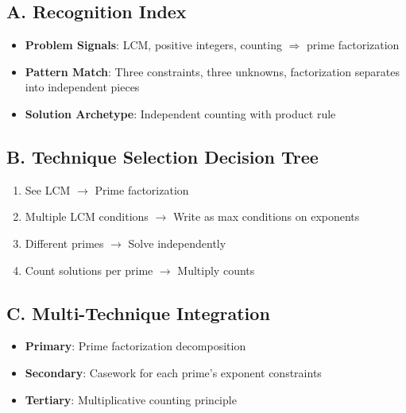 \documentclass[12pt]{article}
\begin{document}
\begin{conversionbox}
\subsection*{A. Recognition Index}
\begin{itemize}[leftmargin=*]
    \item \textbf{Problem Signals}: LCM, positive integers, counting $\Rightarrow$ prime factorization
    \item \textbf{Pattern Match}: Three constraints, three unknowns, factorization separates into independent pieces
    \item \textbf{Solution Archetype}: Independent counting with product rule
\end{itemize}

\subsection*{B. Technique Selection Decision Tree}
\begin{enumerate}
    \item See LCM $\rightarrow$ Prime factorization
    \item Multiple LCM conditions $\rightarrow$ Write as max conditions on exponents  
    \item Different primes $\rightarrow$ Solve independently
    \item Count solutions per prime $\rightarrow$ Multiply counts
\end{enumerate}

\subsection*{C. Multi-Technique Integration}
\begin{itemize}[leftmargin=*]
    \item \textbf{Primary}: Prime factorization decomposition
    \item \textbf{Secondary}: Casework for each prime's exponent constraints
    \item \textbf{Tertiary}: Multiplicative counting principle
\end{itemize}
\end{conversionbox}
\end{document}
